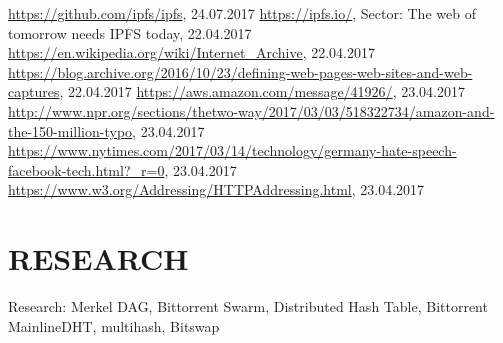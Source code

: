 \documentclass[a4paper,11pt, oneside]{report}
\theoremstyle{definition}
\begin{document}


\begin{thebibliography}{1}
 \url{https://github.com/ipfs/ipfs}, 24.07.2017
 \url{https://ipfs.io/}, Sector: The web of tomorrow needs IPFS today, 22.04.2017
 \url{https://en.wikipedia.org/wiki/Internet_Archive}, 22.04.2017
 \url{https://blog.archive.org/2016/10/23/defining-web-pages-web-sites-and-web-captures}, 22.04.2017
 \url{https://aws.amazon.com/message/41926/}, 23.04.2017
 \url{http://www.npr.org/sections/thetwo-way/2017/03/03/518322734/amazon-and-the-150-million-typo}, 23.04.2017
 \url{https://www.nytimes.com/2017/03/14/technology/germany-hate-speech-facebook-tech.html?_r=0}, 23.04.2017
 \url{https://www.w3.org/Addressing/HTTPAddressing.html}, 23.04.2017 
 
\end{thebibliography}

\printglossaries

\listoffigures
\chapter{RESEARCH}
Research: Merkel DAG, Bittorrent Swarm, Distributed Hash Table, Bittorrent MainlineDHT, multihash, Bitswap
\end{document}
